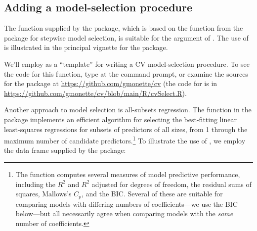 \documentclass[
]{jss}
\begin{document}
\hypertarget{adding-a-model-selection-procedure}{%
\subsection{Adding a model-selection
procedure}\label{adding-a-model-selection-procedure}}

The  function supplied by the  package,
which is based on the  function from the 
package \citep{VenablesRipley:2002} for stepwise model selection, is
suitable for the  argument of . The use
of  is illustrated in the principal vignette for
the package.

We'll employ  as a ``template'' for writing a CV
model-selection procedure. To see the code for this function, type
 at the  command prompt, or examine
the sources for the  package at
\url{https://github.com/gmonette/cv} (the code for
 is in
\url{https://github.com/gmonette/cv/blob/main/R/cvSelect.R}).

Another approach to model selection is all-subsets regression. The
 function in the  package
\citep{LumleyMiller:2020} implements an efficient algorithm for
selecting the best-fitting linear least-squares regressions for subsets
of predictors of all sizes, from 1 through the maximum number of
candidate predictors.\footnote{The  function computes
  several measures of model predictive performance, including the
  \(R^2\) and \(R^2\) adjusted for degrees of freedom, the residual sums
  of squares, Mallows's \(C_p\), and the BIC. Several of these are
  suitable for comparing models with differing numbers of
  coefficients---we use the BIC below---but all necessarily agree when
  comparing models with the \emph{same} number of coefficients.} To
illustrate the use of , we employ the 
data frame supplied by the  package:
\end{document}

